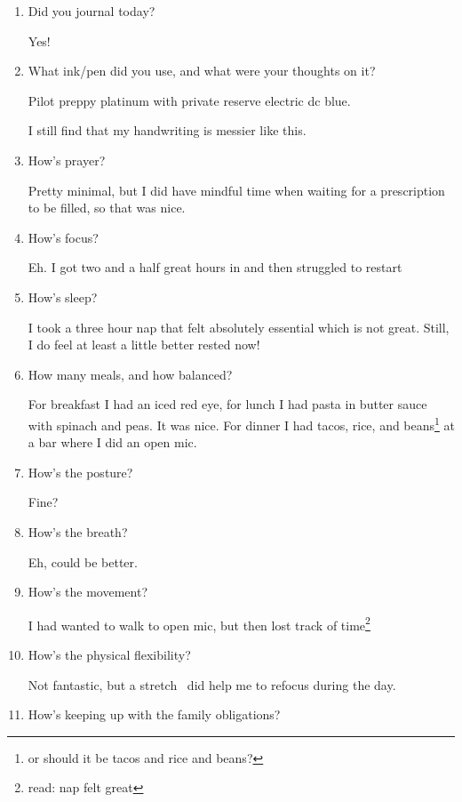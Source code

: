 \documentclass[12pt]{article}
\renewcommand{\,}{\textsuperscript{,}}
\begin{document}
\begin{enumerate}

\item Did you journal today?

Yes!

\item What ink/pen did you use, and what were your thoughts on it?

Pilot preppy platinum with private reserve electric dc blue.

I still find that my handwriting is messier like this.

\item How's prayer?

Pretty minimal, but I did have mindful time when waiting for a prescription to be filled, so that was nice.

\item How's focus?

Eh. I got two and a half great hours in and then struggled to restart

\item How's sleep?

I took a three hour nap that felt absolutely essential which is not great.  
Still, I do feel at least a little better rested now!

\item How many meals, and how balanced?

For breakfast I had an iced red eye, for lunch I had pasta in butter sauce with spinach and peas.  
It was nice.  
For dinner I had tacos, rice, and beans\footnote{or should it be tacos and rice and beans?} at a bar where I did an open mic.

\item How's the posture?

Fine?

\item How's the breath?

Eh, could be better.

\item How's the movement?

I had wanted to walk to open mic, but then lost track of time\footnote{read: nap felt great}

\item How's the physical flexibility?

Not fantastic, but a stretch  did help me to refocus during the day.

\item How's keeping up with the family obligations?


\end{enumerate}
\end{document}
